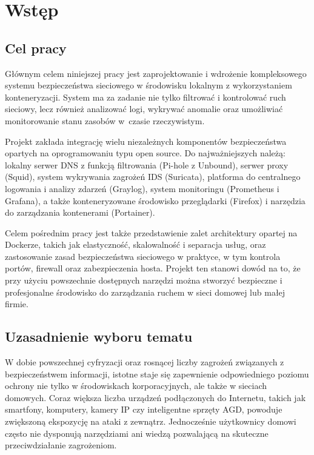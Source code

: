 \documentclass[
    left=2.5cm,         %
    right=2.5cm,        %
    top=2.5cm,          %
    bottom=3cm,         %
    bindingoffset=6mm,  %
    nohyphenation=true %
]{eiti/eiti-thesis} %
\begin{document}
\thispagestyle{empty}
\tableofcontents

\newpage 
\section{Wstęp}
\subsection{Cel pracy}

Głównym celem niniejszej pracy jest zaprojektowanie i wdrożenie kompleksowego systemu bezpieczeństwa sieciowego w środowisku lokalnym z wykorzystaniem konteneryzacji. System ma za zadanie nie tylko filtrować i kontrolować ruch sieciowy, lecz również analizować logi, wykrywać anomalie oraz umożliwiać monitorowanie stanu zasobów w~czasie rzeczywistym.

Projekt zakłada integrację wielu niezależnych komponentów bezpieczeństwa opartych na oprogramowaniu typu open source. Do najważniejszych należą: lokalny serwer DNS 
z funkcją filtrowania (Pi-hole z Unbound), serwer proxy (Squid), system wykrywania zagrożeń IDS (Suricata), platforma do centralnego logowania i analizy zdarzeń (Graylog), system monitoringu (Prometheus i Grafana), a także konteneryzowane środowisko przeglądarki (Firefox) i narzędzia do zarządzania kontenerami (Portainer).

Celem pośrednim pracy jest także przedstawienie zalet architektury opartej na Dockerze, takich jak elastyczność, skalowalność i separacja usług, oraz zastosowanie zasad bezpieczeństwa sieciowego w praktyce, w tym kontrola portów, firewall oraz zabezpieczenia hosta. Projekt ten stanowi dowód na to, że przy użyciu powszechnie dostępnych narzędzi można stworzyć bezpieczne i profesjonalne środowisko do zarządzania ruchem w sieci domowej lub małej firmie.

\subsection{Uzasadnienie wyboru tematu}

W dobie powszechnej cyfryzacji oraz rosnącej liczby zagrożeń związanych z bezpieczeństwem informacji, istotne staje się zapewnienie odpowiedniego poziomu ochrony 
nie tylko w środowiskach korporacyjnych, ale także w sieciach domowych. Coraz większa liczba urządzeń podłączonych do Internetu, takich jak smartfony, komputery, kamery IP czy inteligentne sprzęty AGD, powoduje zwiększoną ekspozycję na ataki z zewnątrz. Jednocześnie użytkownicy domowi często nie dysponują narzędziami ani wiedzą pozwalającą na skuteczne przeciwdziałanie zagrożeniom.
\end{document}
